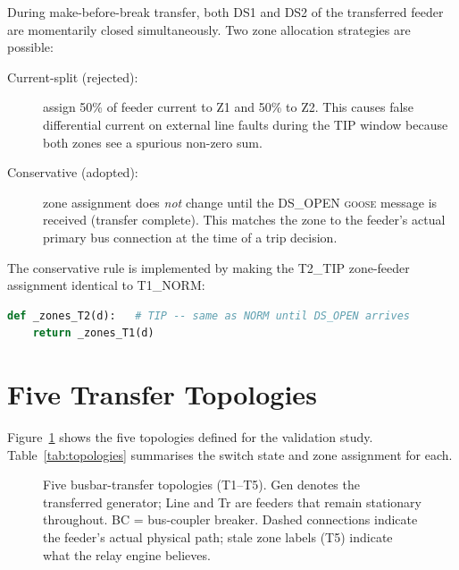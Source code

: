 \documentclass[11pt,a4paper]{article}
\newcommand{\goose}{\textsc{goose}}
\begin{document}
During make-before-break transfer, both DS1 and DS2 of the transferred
feeder are momentarily closed simultaneously.  Two zone allocation
strategies are possible:

\begin{description}
  \item[Current-split (rejected):] assign 50\% of feeder current to Z1
        and 50\% to Z2.  This causes false differential current on external
        line faults during the TIP window because both zones see a spurious
        non-zero sum.
  \item[Conservative (adopted):] zone assignment does \emph{not} change
        until the DS\_OPEN \goose{} message is received (transfer complete).
        This matches the zone to the feeder's actual primary bus connection
        at the time of a trip decision.
\end{description}

The conservative rule is implemented by making the T2\_TIP zone-feeder
assignment identical to T1\_NORM:

\begin{lstlisting}[language=Python, caption={Conservative TIP: zones unchanged until DS\_OPEN}]
def _zones_T2(d):   # TIP -- same as NORM until DS_OPEN arrives
    return _zones_T1(d)
\end{lstlisting}

\section{Five Transfer Topologies}
\label{sec:topologies}

Figure~\ref{fig:topology} shows the five topologies defined for the
validation study.  Table~\ref{tab:topologies} summarises the switch
state and zone assignment for each.

\begin{figure}[h]
  \centering
  \resizebox{\textwidth}{!}{%
  }
  \caption{Five busbar-transfer topologies (T1--T5).  Gen denotes the
           transferred generator; Line and Tr are feeders that remain
           stationary throughout.  BC = bus-coupler breaker.
           Dashed connections indicate the feeder's actual physical path;
           stale zone labels (T5) indicate what the relay engine believes.}
  \label{fig:topology}
\end{figure}
\end{document}
